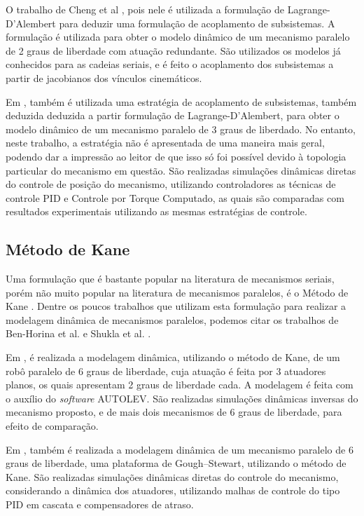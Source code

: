 \documentclass[]{politex}
\begin{document}
O trabalho de Cheng et al \cite{ChengLiu}, pois nele é utilizada a formulação de Lagrange-D’Alembert para deduzir uma formulação de acoplamento de subsistemas. A formulação é utilizada para obter o modelo dinâmico de um mecanismo paralelo de 2 graus de liberdade com atuação redundante. São utilizados os modelos já conhecidos para as cadeias seriais, e é feito o acoplamento dos subsistemas a partir de jacobianos dos vínculos cinemáticos.

Em \cite{Yen}, também é utilizada uma estratégia de acoplamento de subsistemas, também deduzida deduzida a partir formulação de Lagrange-D’Alembert, para obter o modelo dinâmico de um mecanismo paralelo de 3 graus de liberdado. No entanto, neste trabalho, a estratégia não é apresentada de uma maneira mais geral, podendo dar a impressão ao leitor de que isso só foi possível devido à topologia particular do mecanismo em questão. São realizadas simulações dinâmicas diretas do controle de posição do mecanismo, utilizando controladores as técnicas de controle PID e Controle por Torque Computado, as quais são comparadas com resultados experimentais utilizando as mesmas estratégias de controle.

\subsection{Método de Kane}

Uma formulação que é bastante popular na literatura de mecanismos seriais, porém não muito popular na literatura de mecanismos paralelos, é o Método de Kane \cite{Kane}. Dentre os poucos trabalhos que utilizam esta formulação para realizar a modelagem dinâmica de mecanismos paralelos, podemos citar os trabalhos de Ben-Horina et al. \cite{BenHorina} e Shukla et al. \cite{Shukla}.

Em \cite{BenHorina}, é realizada a modelagem dinâmica, utilizando o método de Kane, de um robô paralelo de 6 graus de liberdade, cuja atuação é feita por 3 atuadores planos, os quais apresentam 2 graus de liberdade cada. A modelagem é feita com o auxílio do \emph{software} AUTOLEV. São realizadas simulações dinâmicas inversas do mecanismo proposto, e de mais dois mecanismos de 6 graus de liberdade, para efeito de comparação.

Em \cite{Shukla}, também é realizada a modelagem dinâmica de um mecanismo paralelo de 6 graus de liberdade, uma plataforma de Gough–Stewart, utilizando o método de Kane. São realizadas simulações dinâmicas diretas do controle do mecanismo, considerando a dinâmica dos atuadores, utilizando malhas de controle do tipo PID em cascata e compensadores de atraso.
\end{document}
